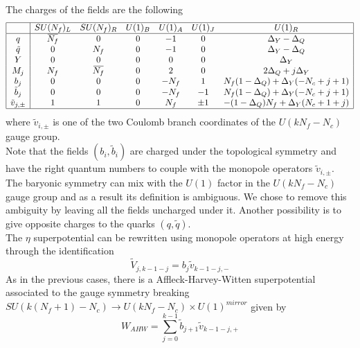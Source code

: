 The charges of the fields are the following
\begin{equation}
\centering
\begin{array}{|c |c c c c c c |}
\hline
 & SU(N_f)_L & SU(N_f)_R & U(1)_B & U(1)_A & U(1)_J & U(1)_R  \\
\hline
q & \overbar{N_f} & 0  & 
0 %
  & -1  & 0  & \Delta_{Y} - \Delta_Q \\
\tilde{q}   & 0  &N_f &
 0 %
 & - 1  & 0 &\Delta_{Y} - \Delta_Q \\
Y & 0 & 0 & 0 & 0 &0 & \Delta_{Y} \\
M_j  & N_f & \overbar{N_f} & 0 & 2 & 0 & 2 \Delta_Q + j \Delta_{Y}\\
b_j & 0  & 0 & 0  &   -N_f &  
1 %
   & N_f ( 1 - \Delta_Q) + \Delta_{Y} (- N_c+ j +1  )  \\
 \tilde{b} _j & 0  & 0 & 0  &   - N_f &  
 -1%
   & N_f ( 1 - \Delta_Q) + \Delta_{Y} (- N_c + j +1 )  \\
 \tilde{v}_{j,\pm} & 1 & 1 & 0 & N_f & \pm 1 & -(1 - \Delta_Q) N_f + \Delta_{Y} (N_c+1 + j)\\
\hline
\end{array}
\end{equation}
where $\tilde{v}_{i,\pm}$ is one of the two Coulomb branch coordinates of the $U(k N_f - N_c)$ gauge group.\\
Note that the fields $(b_i,\tilde{b}_i)$ are charged under the topological symmetry and have the right quantum numbers to couple with the monopole operators $\tilde{v}_{i,\pm}$.\\
The baryonic symmetry can mix with the $U(1)$ factor in the $U(k N_f -N_c)$ gauge group and as a result its definition is ambiguous.
We chose to remove this ambiguity by leaving all the fields uncharged under it.
Another possibility is to give opposite charges to the quarks $(q,\tilde{q})$.\\
The $\eta$ superpotential can be rewritten using monopole operators at high energy through the identification \cite{Nii:2014jsa}
\begin{equation}
 \tilde{V}_{j, k-1-j} = b_{j} \tilde{v}_{k-1-j,-}
\end{equation}
As in the previous cases, there is a Affleck-Harvey-Witten superpotential
associated to the gauge symmetry breaking $SU(k (N_f +1) - N_c) \rightarrow U(k N_f - N_c) \times U(1)^{mirror}$ given by
\begin{equation}
W_{AHW} = \sum_{j=0}^{k-1} \tilde{b}_{j+1} \tilde{v}_{k-1-j,+}
\end{equation}
